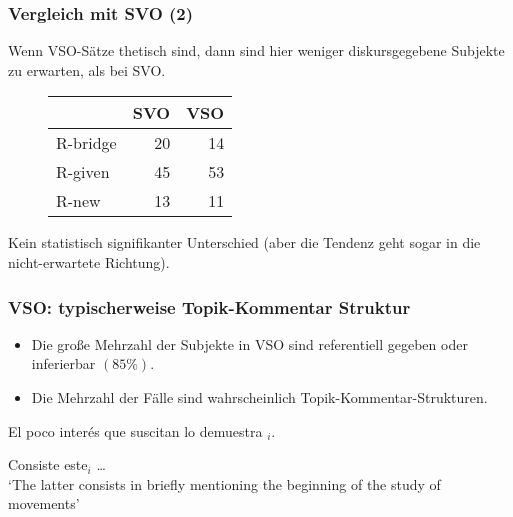 \begin{frame}
  \frametitle{Vergleich mit SVO (2)}

Wenn VSO-Sätze thetisch sind, dann sind hier weniger diskursgegebene Subjekte zu erwarten, als bei SVO.

\pause

\vspace{.3cm}

\begin{figure}
	\begin{tabular}{lrr}
	\hline
	         & SVO & VSO\\
\hline
   R-bridge  & 20  & 14\\
   R-given   & 45 & 53 \\
   R-new     & 13 & 11\\
	\hline	
	\end{tabular}
\end{figure}

\vspace{.3cm}

Kein statistisch signifikanter Unterschied (aber die Tendenz geht sogar in die nicht-erwartete Richtung).

\end{frame}



\begin{frame}
  \frametitle{VSO: typischerweise Topik-Kommentar Struktur}

  \begin{itemize}
 \item Die große Mehrzahl der Subjekte in VSO sind referentiell gegeben oder inferierbar $(85\%)$.%
  \item Die Mehrzahl der Fälle sind wahrscheinlich Topik-Kommentar-Strukturen.
  \end{itemize}
\pause

\begin{exe}
  \ex
  \begin{xlist}
    \ex  El poco interés que suscitan lo demuestra $_i$.%

  \ex Consiste \alert{este}$_i$  \ldots\\
           {\footnotesize `The latter consists in briefly mentioning the beginning of the study of movements'} 
\end{xlist}
\end{exe}  

\end{frame}


